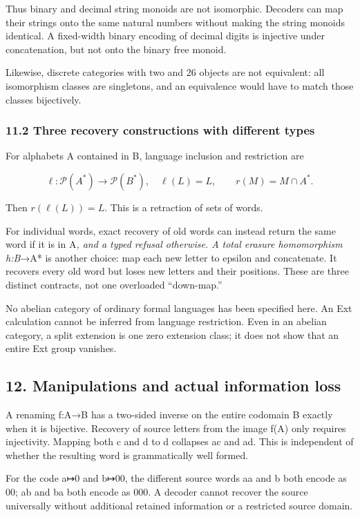 \documentclass[
  11pt,
]{article}
\begin{document}
Thus binary and decimal string monoids are not isomorphic. Decoders can
map their strings onto the same natural numbers without making the
string monoids identical. A fixed-width binary encoding of decimal
digits is injective under concatenation, but not onto the binary free
monoid.

Likewise, discrete categories with two and 26 objects are not
equivalent: all isomorphism classes are singletons, and an equivalence
would have to match those classes bijectively.

\subsubsection{11.2 Three recovery constructions with different
types}\label{three-recovery-constructions-with-different-types}

For alphabets A contained in B, language inclusion and restriction are

\[
\ell:\mathcal P(A^*)\to\mathcal P(B^*),\quad\ell(L)=L,
\qquad r(M)=M\cap A^*.
\]

Then \(r(\ell(L))=L\). This is a retraction of sets of words.

For individual words, exact recovery of old words can instead return the
same word if it is in A\emph{, and a typed refusal otherwise. A total
erasure homomorphism h:B}→A* is another choice: map each new letter to
epsilon and concatenate. It recovers every old word but loses new
letters and their positions. These are three distinct contracts, not one
overloaded ``down-map.''

No abelian category of ordinary formal languages has been specified
here. An Ext calculation cannot be inferred from language restriction.
Even in an abelian category, a split extension is one zero extension
class; it does not show that an entire Ext group vanishes.

\subsection{12. Manipulations and actual information
loss}\label{manipulations-and-actual-information-loss}

A renaming f:A→B has a two-sided inverse on the entire codomain B
exactly when it is bijective. Recovery of source letters from the image
f(A) only requires injectivity. Mapping both c and d to d collapses ac
and ad. This is independent of whether the resulting word is
grammatically well formed.

For the code a↦0 and b↦00, the different source words aa and b both
encode as 00; ab and ba both encode as 000. A decoder cannot recover the
source universally without additional retained information or a
restricted source domain.
\end{document}
